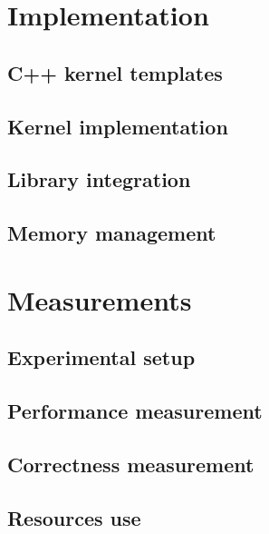 \documentclass[11pt,twoside]{ce}
\begin{document}
\chapter{Implementation}
\label{chap:implementation}


\section{C++ kernel templates}


\section{Kernel implementation}


\section{Library integration}


\section{Memory management}


\chapter{Measurements}
\label{chap:measurements}


\section{Experimental setup}


\section{Performance measurement}


\section{Correctness measurement}


\section{Resources use}

\end{document}
